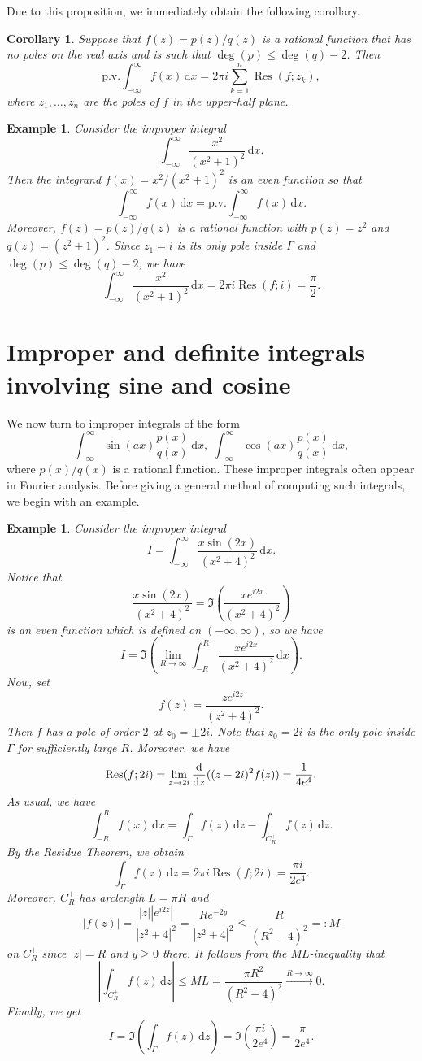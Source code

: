 \documentclass[10pt]{article}
\newcommand{\dd}{\,\mathrm{d}}
\newcommand{\ddz}{\frac{\rm d}{{\rm d}z}}
\newcommand{\pv}{\text{p.v.}}
\DeclareMathOperator{\Res}{Res}
\theoremstyle{newstyle}
\newtheorem{cor}[thm]{Corollary}
\newtheorem{exmp}[thm]{Example}
\begin{document}
Due to this proposition, we immediately obtain the following corollary. 

\begin{cor}
Suppose that $f(z) = p(z)/q(z)$ is a rational function that has no poles on the real axis and is such that 
$\deg(p) \leq \deg(q) - 2$. Then 
\[ \pv\int_{-\infty}^\infty f(x)\dd x = 2\pi i \sum_{k=1}^n \Res(f; z_k), \]
where $z_1, \dots, z_n$ are the poles of $f$ in the upper-half plane.
\end{cor}

\begin{exmp}
Consider the improper integral 
\[ \int_{-\infty}^\infty \frac{x^2}{(x^2+1)^2}\dd x. \]
Then the integrand $f(x) = x^2/(x^2+1)^2$ is an even function so that 
\[ \int_{-\infty}^\infty f(x)\dd x = \pv\int_{-\infty}^\infty f(x)\dd x. \]
Moreover, $f(z) = p(z)/q(z)$ is a rational function with $p(z) = z^2$ and $q(z) = (z^2+1)^2$. 
Since $z_1 = i$ is its only pole inside $\Gamma$ and $\deg(p) \leq \deg(q) - 2$, we have 
\[ \int_{-\infty}^\infty \frac{x^2}{(x^2+1)^2}\dd x = 2\pi i \Res(f; i) = \frac\pi2. \]
\end{exmp}

\newpage 
\section{Improper and definite integrals involving sine and cosine}

We now turn to improper integrals of the form 
\[ \int_{-\infty}^\infty 
\sin(ax)\frac{p(x)}{q(x)}\dd x,\; \int_{-\infty}^\infty \cos(ax)\frac{p(x)}{q(x)}\dd x, \]
where $p(x)/q(x)$ is a rational function. These improper integrals often appear in Fourier analysis. 
Before giving a general method of computing such integrals, we begin with an example. 

\begin{exmp}
Consider the improper integral 
\[ I = \int_{-\infty}^\infty \frac{x\sin(2x)}{(x^2+4)^2}\dd x. \]
Notice that 
\[ \frac{x\sin(2x)}{(x^2+4)^2} = \Im \left( \frac{xe^{i2x}}{(x^2+4)^2} \right) \]
is an even function which is defined on $(-\infty, \infty)$, so we have 
\[ I = \Im \left( \lim_{R\to\infty} \int_{-R}^R \frac{xe^{i2x}}{(x^2+4)^2}\dd x \right). \]
Now, set 
\[ f(z) = \frac{ze^{i2z}}{(z^2+4)^2}. \]
Then $f$ has a pole of order $2$ at $z_0 = \pm2i$. Note that $z_0 = 2i$ is the only pole inside
$\Gamma$ for sufficiently large $R$. Moreover, we have 
\[ \Res(f; 2i) = \lim_{z\to2i} \ddz ((z-2i)^2f(z)) = \frac{1}{4e^4}. \]
As usual, we have 
\[ \int_{-R}^R f(x)\dd x = \int_\Gamma f(z)\dd z - \int_{C_R^+} f(z)\dd z. \]
By the Residue Theorem, we obtain 
\[ \int_\Gamma f(z)\dd z = 2\pi i \Res(f; 2i) = \frac{\pi i}{2e^4}. \]
Moreover, $C_R^+$ has arclength $L = \pi R$ and 
\[ |f(z)| = \frac{|z||e^{i2z}|}{|z^2+4|^2} = \frac{Re^{-2y}}{|z^2+4|^2} \leq \frac{R}{(R^2-4)^2} =: M \]
on $C_R^+$ since $|z| = R$ and $y \geq 0$ there. It follows from the $ML$-inequality that 
\[ \left| \int_{C_R^+} f(z)\dd z \right| \leq ML = \frac{\pi R^2}{(R^2-4)^2} \xrightarrow[]{R\to\infty} 0. \] 
Finally, we get 
\[ I = \Im\left(\int_\Gamma f(z)\dd z \right) = \Im\left( \frac{\pi i}{2e^4} \right) = \frac{\pi}{2e^4}. \]
\end{exmp}
\end{document}
